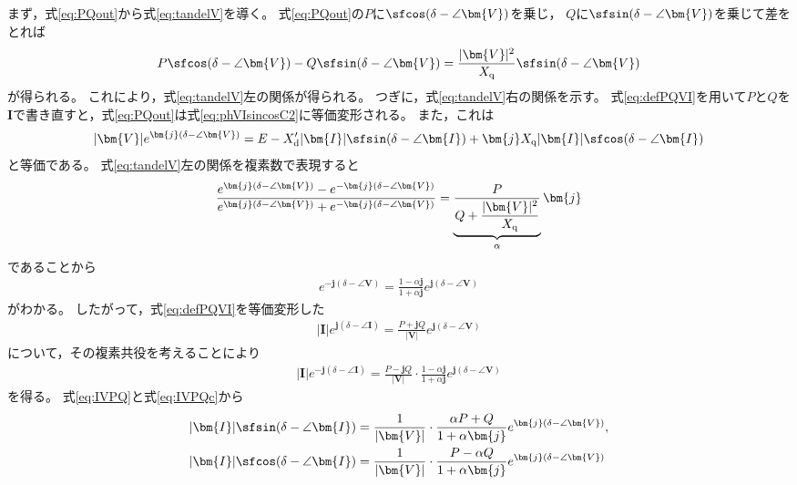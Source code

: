 \documentclass[tombow,dvipdfmx]{corona-a5}
\begin{document}
\begin{証明}
まず，式\ref{eq:PQout}から式\ref{eq:tandelV}を導く。
式\ref{eq:PQout}の$P$に$\sfcos (\delta - \angle \bm{V})$を乗じ，
$Q$に$\sfsin (\delta - \angle \bm{V})$を乗じて差をとれば
\begin{align*}
P \sfcos (\delta - \angle \bm{V}) - Q \sfsin (\delta - \angle \bm{V})
= \frac{|\bm{V}|^2}{X_{\rm q}} \sfsin (\delta - \angle \bm{V}) 
\end{align*}
が得られる。
これにより，式\ref{eq:tandelV}左の関係が得られる。
つぎに，式\ref{eq:tandelV}右の関係を示す。
式\ref{eq:defPQVI}を用いて$P$と$Q$を$\bm{I}$で書き直すと，式\ref{eq:PQout}は式\ref{eq:phVIsincosC2}に等価変形される。
また，これは
\begin{align}\label{eq:tmpVE}
|\bm{V}|e^{\bm{j}(\delta - \angle \bm{V})}=E
-X_{\rm d}' |\bm{I}| \sfsin (\delta - \angle \bm{I})
+ 
\bm{j} X_{\rm q} 
|\bm{I}| \sfcos (\delta - \angle \bm{I})
\end{align}
と等価である。
式\ref{eq:tandelV}左の関係を複素数で表現すると
\begin{align*}
\frac{ e^{\bm{j}(\delta - \angle \bm{V})} - e^{-\bm{j}(\delta - \angle \bm{V})}}
{e^{\bm{j}(\delta - \angle \bm{V})} + e^{-\bm{j}(\delta - \angle \bm{V})}}
= 
\underbrace{
\frac{P}{Q + \frac{ |\bm{V}|^2}{X_{\rm q}} }
}_{\alpha}
 \bm{j}
\end{align*}
であることから
\begin{align*}
e^{-\bm{j}(\delta - \angle \bm{V})} = \frac{1-\alpha \bm{j}}{1+\alpha \bm{j}}
e^{\bm{j}(\delta - \angle \bm{V})}
\end{align*}
がわかる。
したがって，式\ref{eq:defPQVI}を等価変形した
\begin{align}\label{eq:IVPQ}
|\bm{I}|e^{\bm{j}(\delta - \angle \bm{I})} = \frac{P+\bm{j}Q}{|\bm{V}|}  
e^{\bm{j}(\delta - \angle \bm{V})}
\end{align}
について，その複素共役を考えることにより
\begin{align}\label{eq:IVPQc}
|\bm{I}|e^{-\bm{j}(\delta - \angle \bm{I})} = \frac{P-\bm{j}Q}{|\bm{V}|}  
\cdot \frac{1-\alpha \bm{j}}{1+\alpha \bm{j}}
e^{\bm{j}(\delta - \angle \bm{V})}
\end{align}
を得る。
式\ref{eq:IVPQ}と式\ref{eq:IVPQc}から
\begin{align*}
|\bm{I}| \sfsin (\delta - \angle \bm{I})
& =
\frac{1}{|\bm{V}|} \cdot
\frac{\alpha P +Q}{ 1+\alpha \bm{j} }e^{\bm{j}(\delta - \angle \bm{V})}, \\
|\bm{I}| \sfcos (\delta - \angle \bm{I})
& =
\frac{1}{|\bm{V}|} \cdot
\frac{ P - \alpha Q}{ 1+\alpha \bm{j} }e^{\bm{j}(\delta - \angle \bm{V})}

\end{align*}
\end{証明}
\end{document}
